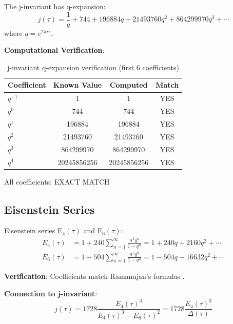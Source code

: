 The j-invariant has q-expansion:
\begin{equation}
j(\tau) = \frac{1}{q} + 744 + 196884q + 21493760q^2 + 864299970q^3 + \cdots
\end{equation}
where $q = e^{2\pi i \tau}$.

\textbf{Computational Verification}:

\begin{table}[H]
\centering
\begin{tabular}{lccc}
\toprule
\textbf{Coefficient} & \textbf{Known Value} & \textbf{Computed} & \textbf{Match} \\
\midrule
$q^{-1}$ & 1 & 1 & \textcolor{validcolor}{YES} \\
$q^0$ & 744 & 744 & \textcolor{validcolor}{YES} \\
$q^1$ & 196884 & 196884 & \textcolor{validcolor}{YES} \\
$q^2$ & 21493760 & 21493760 & \textcolor{validcolor}{YES} \\
$q^3$ & 864299970 & 864299970 & \textcolor{validcolor}{YES} \\
$q^4$ & 20245856256 & 20245856256 & \textcolor{validcolor}{YES} \\
\bottomrule
\end{tabular}
\caption{j-invariant q-expansion verification (first 6 coefficients)}
\end{table}

All coefficients: \textcolor{validcolor}{EXACT MATCH}

\subsection{Eisenstein Series}

Eisenstein series E$_4(\tau)$ and E$_6(\tau)$:
\begin{align}
E_4(\tau) &= 1 + 240 \sum_{n=1}^{\infty} \frac{n^3 q^n}{1-q^n} = 1 + 240q + 2160q^2 + \cdots \\
E_6(\tau) &= 1 - 504 \sum_{n=1}^{\infty} \frac{n^5 q^n}{1-q^n} = 1 - 504q - 16632q^2 + \cdots
\end{align}

\textbf{Verification}: Coefficients match Ramanujan's formulas \cite{ramanujan1916certain}.

\textbf{Connection to j-invariant}:
\begin{equation}
j(\tau) = 1728 \frac{E_4(\tau)^3}{E_4(\tau)^3 - E_6(\tau)^2} = 1728 \frac{E_4(\tau)^3}{\Delta(\tau)}
\end{equation}

